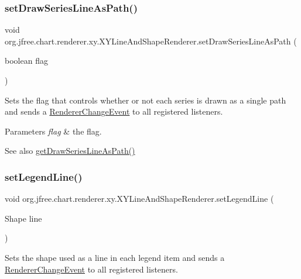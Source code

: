 \subsubsection{\texorpdfstring{set\+Draw\+Series\+Line\+As\+Path()}{setDrawSeriesLineAsPath()}}
{\footnotesize\ttfamily void org.\+jfree.\+chart.\+renderer.\+xy.\+X\+Y\+Line\+And\+Shape\+Renderer.\+set\+Draw\+Series\+Line\+As\+Path (\begin{DoxyParamCaption}\item[{boolean}]{flag }\end{DoxyParamCaption})}

Sets the flag that controls whether or not each series is drawn as a single path and sends a \mbox{\hyperlink{}{Renderer\+Change\+Event}} to all registered listeners.


\begin{DoxyParams}{Parameters}
{\em flag} & the flag.\\
\hline
\end{DoxyParams}
\begin{DoxySeeAlso}{See also}
\mbox{\hyperlink{classorg_1_1jfree_1_1chart_1_1renderer_1_1xy_1_1_x_y_line_and_shape_renderer_a5303dc0f0def660a31760dd5c09b80b9}{get\+Draw\+Series\+Line\+As\+Path()}} 
\end{DoxySeeAlso}
\mbox{\label{classorg_1_1jfree_1_1chart_1_1renderer_1_1xy_1_1_x_y_line_and_shape_renderer_ad7e97da27d2d5c3b9eb1c3a89d471e19}} 
\subsubsection{\texorpdfstring{set\+Legend\+Line()}{setLegendLine()}}
{\footnotesize\ttfamily void org.\+jfree.\+chart.\+renderer.\+xy.\+X\+Y\+Line\+And\+Shape\+Renderer.\+set\+Legend\+Line (\begin{DoxyParamCaption}\item[{Shape}]{line }\end{DoxyParamCaption})}

Sets the shape used as a line in each legend item and sends a \mbox{\hyperlink{}{Renderer\+Change\+Event}} to all registered listeners.


